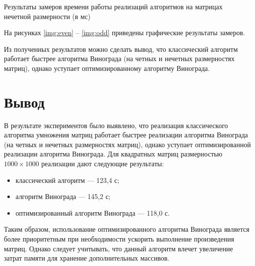 \begin{table}[h]
	\centering
	\caption{Результаты замеров времени работы реализаций алгоритмов на матрицах нечетной размерности (в мс)}
	\label{tbl:odd}
\end{table}
\clearpage
На рисунках \ref{img:even} -- \ref{img:odd} приведены графические результаты замеров.

\clearpage


Из полученных результатов можно сделать вывод, что классический алгоритм работает быстрее алгоритма Винограда (на четных и нечетных размерностях матриц), однако уступает оптимизированному алгоритму Винограда.

\section*{Вывод}

В результате экспериментов было выявлено, что реализация классического алгоритма умножения матриц работает быстрее реализации алгоритма Винограда (на четных и нечетных размерностях матриц), однако уступает оптимизированной реализации алгоритма Винограда. Для квадратных матриц размерностью $1000\times1000$ реализации дают следующие результаты:
\begin{itemize}
	\item классический алгоритм --- 123,4 с;
	\item алгоритм Винограда --- 145,2 с;
	\item оптимизированный алгоритм Винограда --- 118,0 с.
\end{itemize}

Таким образом, использование оптимизированного алгоритма Винограда является более приоритетным при необходимости ускорить выполнение произведения матриц. 
Однако следует учитывать, что данный алгоритм влечет увеличение затрат памяти для хранение дополнительных массивов.



